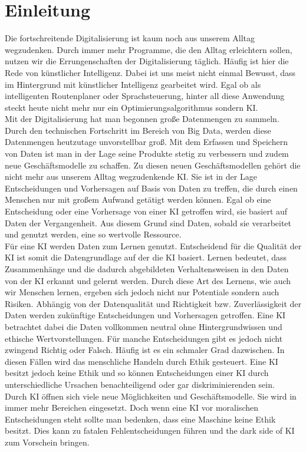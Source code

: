 \chapter{Einleitung}
\begin{onehalfspace}    
    \label{sec:einleitung}
        Die fortschreitende Digitalisierung ist kaum noch aus unserem Alltag wegzudenken. Durch immer mehr Programme, die den Alltag erleichtern sollen, nutzen wir die Errungenschaften der Digitalisierung täglich. Häufig ist hier die Rede von künstlicher Intelligenz. Dabei ist uns meist nicht einmal Bewusst, dass im Hintergrund mit künstlicher Intelligenz gearbeitet wird. Egal ob als intelligenten Routenplaner oder Sprachsteuerung, hinter all diese Anwendung steckt heute nicht mehr nur ein Optimierungsalgorithmus sondern \ac{KI}.\cite{Horn2022}
        \\
        Mit der Digitalisierung hat man begonnen große Datenmengen zu sammeln. Durch den technischen Fortschritt im Bereich von Big Data, werden diese Datenmengen heutzutage unvorstellbar groß. Mit dem Erfassen und Speichern von Daten ist man in der Lage seine Produkte stetig zu verbessern und zudem neue Geschäftsmodelle zu schaffen. Zu diesen neuen Geschäftsmodellen gehört die nicht mehr aus unserem Alltag wegzudenkende \ac{KI}. Sie ist in der Lage Entscheidungen und Vorhersagen auf Basis von Daten zu treffen, die durch einen Menschen nur  mit großem Aufwand getätigt werden können.  Egal ob eine Entscheidung oder eine Vorhersage von einer \ac{KI} getroffen wird, sie basiert auf Daten der Vergangenheit. Aus diesem Grund sind Daten, sobald sie verarbeitet und genutzt werden, eine so wertvolle Ressource.\cite{Otto2019}
        \\
        Für eine \ac*{KI} werden Daten zum Lernen genutzt. Entscheidend für die Qualität der \ac*{KI} ist somit die Datengrundlage auf der die \ac*{KI} basiert. Lernen bedeutet, dass Zusammenhänge und die dadurch abgebildeten Verhaltensweisen in den Daten von der \ac*{KI} erkannt und gelernt werden. Durch diese Art des Lernens, wie auch wir Menschen lernen, ergeben sich jedoch nicht nur Potentiale sondern auch Risiken. Abhängig von der Datenqualität und Richtigkeit bzw. Zuverlässigkeit der Daten werden zukünftige Entscheidungen und Vorhersagen getroffen. Eine \ac*{KI} betrachtet dabei die Daten vollkommen neutral ohne Hintergrundwissen und ethische Wertvorstellungen. Für manche Entscheidungen gibt es jedoch nicht zwingend Richtig oder Falsch. Häufig ist es ein schmaler Grad dazwischen. In diesen Fällen wird das menschliche Handeln durch Ethik gesteuert. Eine \ac*{KI} besitzt jedoch keine Ethik und so können Entscheidungen einer KI durch unterschiedliche Ursachen benachteiligend oder gar diskriminierenden sein.\cite{Cremers2019}
        \\
        Durch \ac*{KI} öffnen sich viele neue Möglichkeiten und Geschäftsmodelle. Sie wird in immer mehr Bereichen eingesetzt. Doch wenn eine \ac*{KI} vor moralischen Entscheidungen steht sollte man bedenken, dass eine Maschine keine Ethik besitzt. Dies kann zu fatalen Fehlentscheidungen führen und \glqq{}the dark side of \ac*{KI}\grqq{} zum Vorschein bringen.


\end{onehalfspace}
